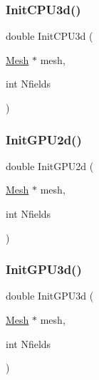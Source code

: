 \mbox{\label{a00554_a04c9f7c3bec6e6a2e833dbe2752fa76d}} 
\subsubsection{\texorpdfstring{Init\+C\+P\+U3d()}{InitCPU3d()}}
{\footnotesize\ttfamily double Init\+C\+P\+U3d (\begin{DoxyParamCaption}\item[{\hyperlink{a00557_aeffbe0891ab73a4d8964c9cb7978426e}{Mesh} $\ast$}]{mesh,  }\item[{int}]{Nfields }\end{DoxyParamCaption})}

\mbox{\label{a00554_ab965ef78f495dbc09dddf8540c0f47e2}} 
\subsubsection{\texorpdfstring{Init\+G\+P\+U2d()}{InitGPU2d()}}
{\footnotesize\ttfamily double Init\+G\+P\+U2d (\begin{DoxyParamCaption}\item[{\hyperlink{a00557_aeffbe0891ab73a4d8964c9cb7978426e}{Mesh} $\ast$}]{mesh,  }\item[{int}]{Nfields }\end{DoxyParamCaption})}

\mbox{\label{a00554_ab16dab9b00f6c601b3a5dd593f23c3de}} 
\subsubsection{\texorpdfstring{Init\+G\+P\+U3d()}{InitGPU3d()}}
{\footnotesize\ttfamily double Init\+G\+P\+U3d (\begin{DoxyParamCaption}\item[{\hyperlink{a00557_aeffbe0891ab73a4d8964c9cb7978426e}{Mesh} $\ast$}]{mesh,  }\item[{int}]{Nfields }\end{DoxyParamCaption})}

\mbox{\label{a00554_ad2387c52fae7bf66e1511ef9a281ee26}} 
